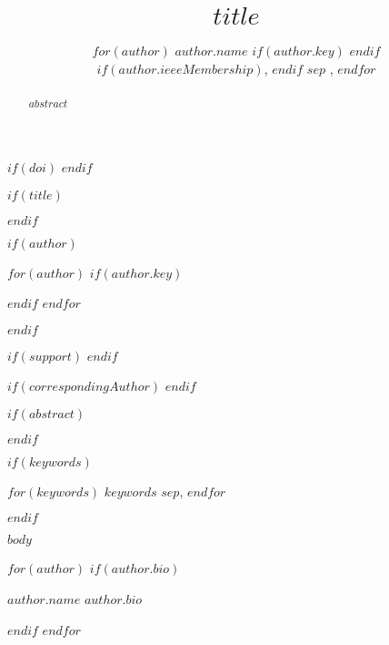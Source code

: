 \documentclass{ieeeaccess}
\begin{document}
$if(doi)$
$endif$

$if(title)$
\title{$title$}
$endif$

$if(author)$

\author{
$for(author)$
\uppercase{$author.name$} $if(author.key)$  $endif$ $if(author.ieeeMembership)$,  $endif$ $sep$ ,
$endfor$
}

$for(author)$
$if(author.key)$
\address[$author.key$]{
	$if(author.institution)$ $author.institution$ $endif$,
	$if(author.city)$ $author.city$ $endif$,
	$if(author.address)$ $author.address$ $endif$
	$if(author.email)$ (email: $author.email$) $endif$
}
$endif$
$endfor$

$endif$

$if(support)$  $endif$


$if(correspondingAuthor)$  $endif$

$if(abstract)$
\begin{abstract}
$abstract$
\end{abstract}
$endif$

$if(keywords)$
\begin{keywords}
$for(keywords)$
	$keywords$ $sep$,
$endfor$
\end{keywords}
$endif$

\titlepgskip=-15pt
\maketitle

$body$

 



$for(author)$
$if(author.bio)$
\begin{IEEEbiography} 
	{$author.name$} $author.bio$
\end{IEEEbiography}
$endif$
$endfor$

\EOD
\end{document}
